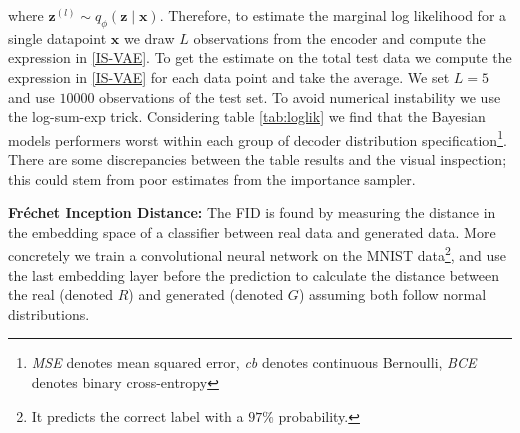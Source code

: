 \iffalse

\begin{align}
	\nonumber
	\log p_{\bm{\theta}}(\mathbf{x}) & = \log \int p_{\bm{\theta}}(\mathbf{x}, \mathbf{z})
	\frac{q_{\phi}(\mathbf{z} \mid \mathbf{x})}{q_{\phi}(\mathbf{z} \mid \mathbf{x})}
	d \mathbf{z}                                                                                        \\
	                                 & =
	\nonumber
	\log \mathbb{E}_{q_{\bm{\phi}}(\mathbf{z} \mid  \mathbf{x})} \left[
		\frac{
			p_{\bm{\theta}}(\mathbf{x}, \mathbf{z})
		}{q_{\phi}(\mathbf{z} \mid \mathbf{x})}
	\right]                                                                                             \\
	\label{IS-VAE}
	\Leftrightarrow
	\log p_{\bm{\theta}}(\mathbf{x}) & \approx
	\log \frac{1}{L} \sum_{l=1}^{L}
	\frac{
		p_{\bm{\theta}}(\mathbf{x} \mid  \mathbf{z}^{(l)}) p_{\bm{\theta}}(\mathbf{z})
	}{
		q_{\phi}(\mathbf{z}^{(l)} \mid \mathbf{x})
	}
\end{align}

\fi

where $\mathbf{z}^{(l)} \sim q_{\phi}(\mathbf{z} \mid \mathbf{x}) $. 
Therefore, to estimate the marginal log likelihood for a single datapoint $\mathbf{x}$
we draw $L$ observations from the encoder and compute the expression in \eqref{IS-VAE}.
To get the estimate on the total test data we compute the expression in \eqref{IS-VAE} 
for each data point and take the average. We set $L = 5$ and use $10000$ observations of the test set.
To avoid numerical instability we use the log-sum-exp trick. Considering table \ref{tab:loglik} we find that the Bayesian models performers worst within each group of decoder distribution specification\footnote{\textit{MSE} denotes mean squared error, \textit{cb} denotes continuous Bernoulli, \textit{BCE} denotes binary cross-entropy}.
There are some discrepancies between the table results and the visual inspection; this could stem from poor estimates from the importance sampler.
\begin{table}[ht]
    \centering
    \caption{Marginal log likelihood}
    \label{tab:loglik}
\end{table}
\textbf{Fréchet Inception Distance:} The FID is found by measuring the distance in the embedding space of a classifier between real data and generated data. More concretely we train a convolutional neural network on the MNIST data\footnote{It predicts the correct label with a $97\%$ probability.}, and use the last embedding layer before the prediction to calculate the distance between the real (denoted $R$) and generated (denoted $G$) assuming both follow normal distributions. 

